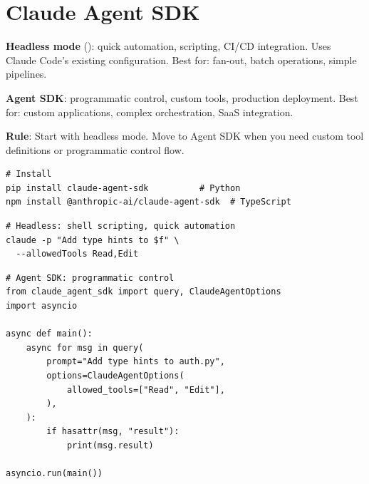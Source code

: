 

\section{Claude Agent SDK}
\label{sec:agent-sdk}


\begin{decisionbox}
\textbf{Headless mode} (): quick automation, scripting,
CI/CD integration. Uses Claude Code's existing configuration.
Best for: fan-out, batch operations, simple pipelines.

\textbf{Agent SDK}: programmatic control, custom tools, production deployment.
Best for: custom applications, complex orchestration, SaaS integration.

\textbf{Rule}: Start with headless mode. Move to Agent SDK when you need
custom tool definitions or programmatic control flow.
\end{decisionbox}


\begin{verbatim}
# Install
pip install claude-agent-sdk          # Python
npm install @anthropic-ai/claude-agent-sdk  # TypeScript
\end{verbatim}

\begin{fullwidth}
\begin{beforeafter}
\before
\begin{verbatim}
# Headless: shell scripting, quick automation
claude -p "Add type hints to $f" \
  --allowedTools Read,Edit
\end{verbatim}

\after
\begin{verbatim}
# Agent SDK: programmatic control
from claude_agent_sdk import query, ClaudeAgentOptions
import asyncio

async def main():
    async for msg in query(
        prompt="Add type hints to auth.py",
        options=ClaudeAgentOptions(
            allowed_tools=["Read", "Edit"],
        ),
    ):
        if hasattr(msg, "result"):
            print(msg.result)

asyncio.run(main())
\end{verbatim}
\end{beforeafter}
\end{fullwidth}

